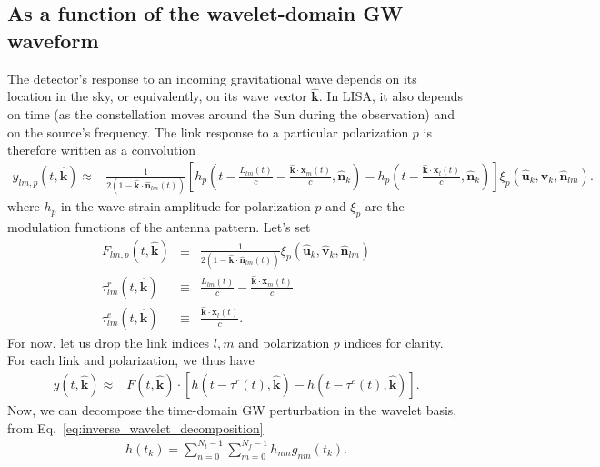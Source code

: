 \documentclass{article}
\begin{document}
\subsection{As a function of the wavelet-domain GW waveform}
The detector's response to an incoming gravitational wave depends on its location in the sky, or equivalently, on its wave vector $\hat{\mathbf{k}}$. In LISA, it also depends on time (as the constellation moves around the Sun during the observation) and on the source's frequency. The link response to a particular polarization $p$ is therefore written as a convolution 
\begin{eqnarray}
y_{l m, p}(t, \hat{\mathbf{k}}) \approx & \frac{1}{2\left(1-\hat{\mathbf{k}} \cdot \hat{\mathbf{n}}_{l m}(t)\right)}\left[ 
 h_p\left(t-\frac{L_{l m}(t)}{c}-\frac{\hat{\mathbf{k}} \cdot \mathbf{x}_m(t)}{c}, \hat{\mathbf{n}}_k\right) 
-h_p\left(t-\frac{\hat{\mathbf{k}} \cdot \mathbf{x}_l(t)}{c}, \hat{\mathbf{n}}_k\right)\right] \xi_p\left(\hat{\mathbf{u}}_k, \hat{\mathbf{v}}_k, \hat{\mathbf{n}}_{l m}\right) .
\end{eqnarray}
where $h_p$ in the wave strain amplitude for polarization $p$ and $\xi_p$ are the modulation functions of the antenna pattern.
Let's set 
\begin{eqnarray}
    F_{lm, p}(t, \hat{\mathbf{k}}) & \equiv & \frac{1}{2\left(1-\hat{\mathbf{k}} \cdot \hat{\mathbf{n}}_{l m}(t)\right)} \xi_p\left(\hat{\mathbf{u}}_k, \hat{\mathbf{v}}_k, \hat{\mathbf{n}}_{l m}\right) \\ 
    \tau^{r}_{lm}(t, \hat{\mathbf{k}}) & \equiv & \frac{L_{l m}(t)}{c}-\frac{\hat{\mathbf{k}} \cdot \mathbf{x}_m(t)}{c}\\
    \tau^{e}_{lm}(t, \hat{\mathbf{k}}) & \equiv & \frac{\hat{\mathbf{k}} \cdot \mathbf{x}_l(t)}{c}.
\end{eqnarray}
For now, let us drop the link indices $l, m$ and polarization $p$ indices for clarity.
For each link and polarization, we thus have
\begin{eqnarray}
\label{eq:response_simple}
y(t, \hat{\mathbf{k}}) \approx & F(t, \hat{\mathbf{k}}) \cdot \left[ 
 h\left(t-\tau^{r}(t), \hat{\mathbf{k}}\right) -h\left(t-\tau^{e}(t), \hat{\mathbf{k}} \right) \right].
\end{eqnarray}
Now, we can decompose the time-domain GW perturbation in the wavelet basis, from Eq.~\eqref{eq:inverse_wavelet_decomposition}
\begin{align}
\label{eq:inverse_wavelet_decomposition_2}
h(t_k) = \sum_{n=0}^{N_t-1}\sum_{m=0}^{N_f-1}h_{nm}g_{nm}(t_k).
\end{align}
\end{document}
